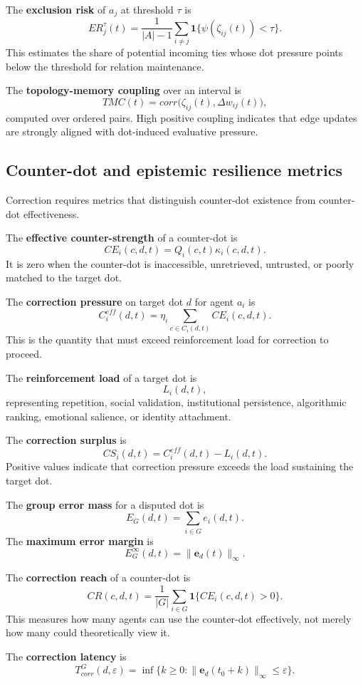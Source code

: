 \documentclass[11pt]{article}
\theoremstyle{remark}
\begin{document}
The \textbf{exclusion risk} of $a_j$ at threshold $\tau$ is
$$
ER_j^\tau(t)=
\frac{1}{|A|-1}\sum_{i\neq j}\mathbf 1\{\psi(\zeta_{ij}(t))<\tau\}.
$$
This estimates the share of potential incoming ties whose dot pressure
points below the threshold for relation maintenance.

The \textbf{topology-memory coupling} over an interval is
$$
TMC(t)=corr\big(\zeta_{ij}(t),\Delta w_{ij}(t)\big),
$$
computed over ordered pairs. High positive coupling indicates that edge
updates are strongly aligned with dot-induced evaluative pressure.

\subsection{Counter-dot and epistemic resilience metrics}\label{counter-dot-and-epistemic-resilience-metrics}

Correction requires metrics that distinguish counter-dot existence from
counter-dot effectiveness.

The \textbf{effective counter-strength} of a counter-dot is
$$
CE_i(c,d,t)=Q_i(c,t)\kappa_i(c,d,t).
$$
It is zero when the counter-dot is inaccessible, unretrieved, untrusted,
or poorly matched to the target dot.

The \textbf{correction pressure} on target dot $d$ for agent $a_i$ is
$$
C_i^{eff}(d,t)=\eta_i\sum_{c\in C_i(d,t)}CE_i(c,d,t).
$$
This is the quantity that must exceed reinforcement load for correction
to proceed.

The \textbf{reinforcement load} of a target dot is
$$
L_i(d,t),
$$
representing repetition, social validation, institutional persistence,
algorithmic ranking, emotional salience, or identity attachment.

The \textbf{correction surplus} is
$$
CS_i(d,t)=C_i^{eff}(d,t)-L_i(d,t).
$$
Positive values indicate that correction pressure exceeds the load
sustaining the target dot.

The \textbf{group error mass} for a disputed dot is
$$
E_G(d,t)=\sum_{i\in G}e_i(d,t).
$$
The \textbf{maximum error margin} is
$$
E_G^{\infty}(d,t)=\|\mathbf e_d(t)\|_\infty.
$$

The \textbf{correction reach} of a counter-dot is
$$
CR(c,d,t)=\frac{1}{|G|}\sum_{i\in G}\mathbf 1\{CE_i(c,d,t)>0\}.
$$
This measures how many agents can use the counter-dot effectively, not
merely how many could theoretically view it.

The \textbf{correction latency} is
$$
T_{corr}^{G}(d,\varepsilon)=
\inf\{k\geq0:\|\mathbf e_d(t_0+k)\|_\infty\leq\varepsilon\}.
$$
\end{document}
